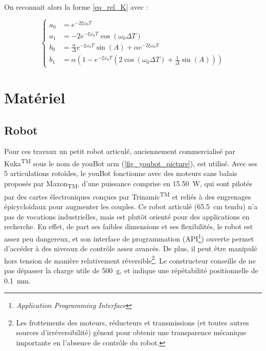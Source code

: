 \begin{appendices}
	On reconnait alors la forme \cref{eq_rel_K} avec :
	
	\begin{equation}
		\begin{cases}
			a_0 &= e^{-2\xi\omega_0T} \\
			a_1 &= -2e^{-\xi\omega_0T} \cos\left(\omega_0 \Delta T\right) \\
			b_0 &= \frac{\alpha}{\Delta} e^{-\xi\omega_0T} \sin(A) + \alpha e^{-2\xi\omega_0T} \\
			b_1 &= \alpha \left( 1 - e^{-\xi\omega_0T} \left( 2\cos(\omega_0\Delta T) + \frac{1}{\Delta} \sin(A) \right) \right)
		\end{cases}
	\end{equation}

	\chapter{Matériel} \label{app_apparatus}
	
	\section{Robot} \label{app_apparatus_sec_robot}
	
	Pour ces travaux un petit robot articulé, anciennement commercialisé par Kuka\textsuperscript{TM} sous le nom de youBot arm (\cref{fig_youbot_picture}), est utilisé. Avec ses 5 articulations rotoïdes, le youBot fonctionne avec des moteurs sans balais proposés par Maxon\textsubscript{TM}, d'une puissance comprise en \SIlist{15,50}{\watt}, qui sont pilotés par des cartes électroniques conçues par Trinamic\textsuperscript{TM} \parencite{TRINAMIC_manual_2011} et reliés à des engrenages épicycloïdaux pour augmenter les couples. Ce robot articulé (\SI{65.5}{\centi\meter} tendu) n'a pas de vocations industrielles, mais est plutôt orienté pour des applications en recherche. En effet, de part ses faibles dimensions et ses flexibilités, le robot est assez peu dangereux, et son interface de programmation (API\footnote{\textit{Application Programming Interface}}) ouverte permet d'accéder à des niveaux de contrôle assez avancés. De plus, il peut être manipulé hors tension de manière relativement réversible\footnote{Les frottements des moteurs, réducteurs et transmissions (et toutes autres sources d'irréversibilité) gênent pour obtenir une transparence mécanique importante en l'absence de contrôle du robot.}. Le constructeur conseille de ne pas dépasser la charge utile de \SI{500}{\gram}, et indique une répétabilité positionnelle de \SI{0.1}{\milli\meter}. 
	

\end{appendices}
